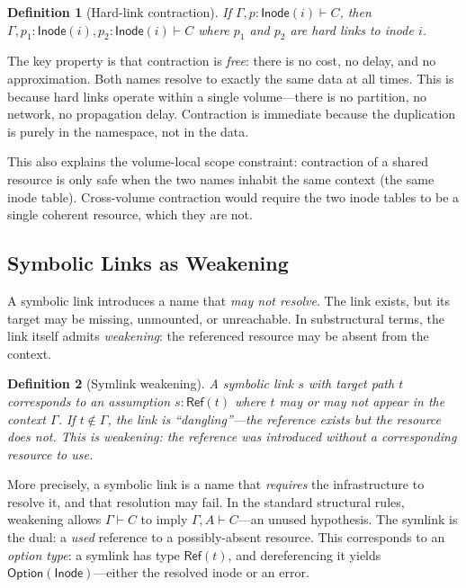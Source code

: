 \documentclass[11pt]{article}
\newtheorem{definition}{Definition}
\newcommand{\tp}[1]{\mathsf{#1}}
\begin{document}
\begin{definition}[Hard-link contraction]
If $\Gamma, p : \tp{Inode}(i) \vdash C$, then
$\Gamma, p_1 : \tp{Inode}(i), p_2 : \tp{Inode}(i) \vdash C$ where $p_1$ and
$p_2$ are hard links to inode $i$.
\end{definition}

The key property is that contraction is \emph{free}: there is no cost, no
delay, and no approximation. Both names resolve to exactly the same data at all
times. This is because hard links operate within a single volume---there is no
partition, no network, no propagation delay. Contraction is immediate because
the duplication is purely in the namespace, not in the data.

This also explains the volume-local scope constraint: contraction of a shared
resource is only safe when the two names inhabit the same context (the same
inode table). Cross-volume contraction would require the two inode tables to be
a single coherent resource, which they are not.

\subsection{Symbolic Links as Weakening}

A symbolic link introduces a name that \emph{may not resolve}. The link
exists, but its target may be missing, unmounted, or unreachable. In
substructural terms, the link itself admits \emph{weakening}: the referenced
resource may be absent from the context.

\begin{definition}[Symlink weakening]
A symbolic link $s$ with target path $t$ corresponds to an assumption
$s : \tp{Ref}(t)$ where $t$ may or may not appear in the context $\Gamma$.
If $t \notin \Gamma$, the link is ``dangling''---the reference exists but the
resource does not. This is weakening: the reference was introduced without a
corresponding resource to use.
\end{definition}

More precisely, a symbolic link is a name that \emph{requires} the
infrastructure to resolve it, and that resolution may fail. In the standard
structural rules, weakening allows $\Gamma \vdash C$ to imply $\Gamma, A
\vdash C$---an unused hypothesis. The symlink is the dual: a \emph{used}
reference to a possibly-absent resource. This corresponds to an \emph{option
type}: a symlink has type $\tp{Ref}(t)$, and dereferencing it yields
$\tp{Option}(\tp{Inode})$---either the resolved inode or an error.
\end{document}
